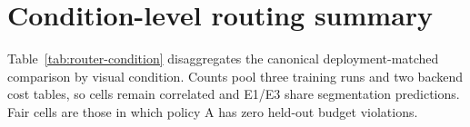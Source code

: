 \documentclass[a4paper,review,12pt]{elsarticle}
\begin{document}
\section{Condition-level routing summary}

Table~\ref{tab:router-condition} disaggregates the canonical deployment-matched comparison by visual condition. Counts pool three training runs and two backend cost tables, so cells remain correlated and E1/E3 share segmentation predictions. Fair cells are those in which policy A has zero held-out budget violations.

\setcounter{table}{0}
\renewcommand{\thetable}{S\arabic{table}}
\renewcommand{\theHtable}{S\arabic{table}}
\begin{table}[H]
\centering
\caption{Condition-level configured and pooled D comparisons against policy A. W/T/L and mean $\Delta$ use fair cells; violation counts use all 24 cells per condition. Configured and pooled D each have zero violations, so one D column is shown. These are descriptive correlated operating cells, not independent samples.}
\label{tab:router-condition}
\scriptsize
\setlength{\tabcolsep}{3.0pt}
\resizebox{\textwidth}{!}{%
%
}
\end{table}
\end{document}
